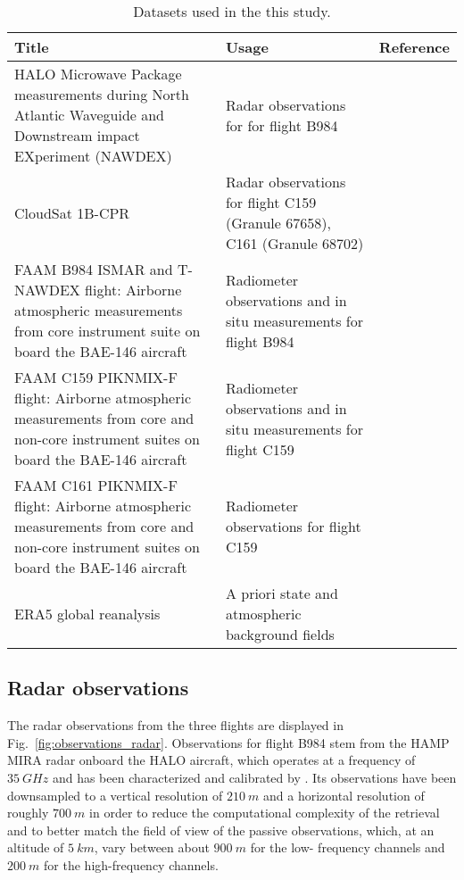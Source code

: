 \documentclass[journal abbreviation, manuscript]{copernicus}
\begin{document}
\begin{table}
  \centering
  \caption{Datasets used in the this study.}
  \begin{tabular}{p{5cm}|p{5cm}|p{3cm}}
     Title &  Usage &  Reference \\
    \hline
    \hline

    HALO Microwave Package measurements during North Atlantic Waveguide and
    Downstream impact EXperiment (NAWDEX)
    & Radar observations for for flight B984
    & \citet{hamp_nawdex} \\
    \hline

    CloudSat 1B-CPR
    & Radar observations for flight C159 (Granule 67658), C161 (Granule 68702)
    &  \citet{tanelli08}  \\
    \hline

    FAAM B984 ISMAR and T-NAWDEX flight: Airborne atmospheric measurements from
    core instrument suite on board the BAE-146 aircraft
    & Radiometer observations and in situ measurements for flight B984
    & \citet{faam_nawdex_obs} \\
    \hline

  FAAM C159 PIKNMIX-F flight: Airborne atmospheric measurements from core and
  non-core instrument suites on board the BAE-146 aircraft
  & Radiometer observations and in situ measurements for flight C159
  & \citet{faam_c159_obs} \\
    \hline

  FAAM C161 PIKNMIX-F flight: Airborne atmospheric measurements from core and
  non-core instrument suites on board the BAE-146 aircraft
    & Radiometer observations for flight C159
    & \citet{faam_c161_obs} \\
    \hline 

    ERA5 global reanalysis
    & A priori state and atmospheric background fields
    & \citet{era5}
  \end{tabular}
  \label{tab:data}
\end{table}


\subsection{Radar observations}

The radar observations from the three flights are displayed in
Fig.~\ref{fig:observations_radar}. Observations for flight B984 stem from the
HAMP MIRA radar \citep{mech14} onboard the HALO aircraft, which operates at a
frequency of $35\ \unit{GHz}$ and has been characterized and calibrated by
\citet{ewald19}. Its observations have been downsampled to a vertical resolution
of $210\ \unit{m}$ and a horizontal resolution of roughly $700\ \unit{m}$ in
order to reduce the computational complexity of the retrieval and to better
match the field of view of the passive observations, which, at an altitude of
$5\ \unit{km}$, vary between about $900\ \unit{m}$ for the low- frequency
channels and $200\ \unit{m}$ for the high-frequency channels.
\end{document}
